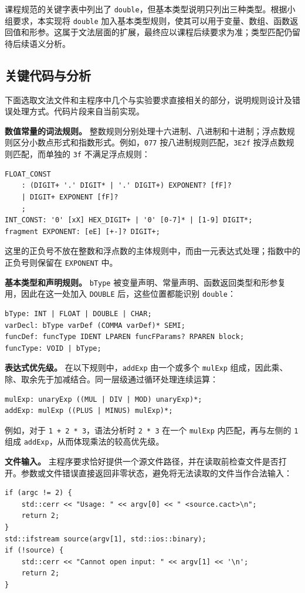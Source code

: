 \documentclass[UTF8,a4paper,11pt]{ctexart}
\begin{document}
课程规范的关键字表中列出了 \texttt{double}，但基本类型说明只列出三种类型。根据小组要求，本实现将 \texttt{double} 加入基本类型规则，使其可以用于变量、数组、函数返回值和形参。这属于文法层面的扩展，最终应以课程后续要求为准；类型匹配仍留待后续语义分析。

\subsection{关键代码与分析}
下面选取文法文件和主程序中几个与实验要求直接相关的部分，说明规则设计及错误处理方式。代码片段来自当前实现。

\textbf{数值常量的词法规则。} 整数规则分别处理十六进制、八进制和十进制；浮点数规则区分小数点形式和指数形式。例如，\texttt{077} 按八进制规则匹配，\texttt{3E2f} 按浮点数规则匹配，而单独的 \texttt{3f} 不满足浮点规则：
\begin{lstlisting}
FLOAT_CONST
    : (DIGIT+ '.' DIGIT* | '.' DIGIT+) EXPONENT? [fF]?
    | DIGIT+ EXPONENT [fF]?
    ;
INT_CONST: '0' [xX] HEX_DIGIT+ | '0' [0-7]* | [1-9] DIGIT*;
fragment EXPONENT: [eE] [+-]? DIGIT+;
\end{lstlisting}
这里的正负号不放在整数和浮点数的主体规则中，而由一元表达式处理；指数中的正负号则保留在 \texttt{EXPONENT} 中。

\textbf{基本类型和声明规则。} \texttt{bType} 被变量声明、常量声明、函数返回类型和形参复用，因此在这一处加入 \texttt{DOUBLE} 后，这些位置都能识别 \texttt{double}：
\begin{lstlisting}
bType: INT | FLOAT | DOUBLE | CHAR;
varDecl: bType varDef (COMMA varDef)* SEMI;
funcDef: funcType IDENT LPAREN funcFParams? RPAREN block;
funcType: VOID | bType;
\end{lstlisting}

\textbf{表达式优先级。} 在以下规则中，\texttt{addExp} 由一个或多个 \texttt{mulExp} 组成，因此乘、除、取余先于加减结合。同一层级通过循环处理连续运算：
\begin{lstlisting}
mulExp: unaryExp ((MUL | DIV | MOD) unaryExp)*;
addExp: mulExp ((PLUS | MINUS) mulExp)*;
\end{lstlisting}
例如，对于 \texttt{1 + 2 * 3}，语法分析时 \texttt{2 * 3} 在一个 \texttt{mulExp} 内匹配，再与左侧的 \texttt{1} 组成 \texttt{addExp}，从而体现乘法的较高优先级。

\textbf{文件输入。} 主程序要求恰好提供一个源文件路径，并在读取前检查文件是否打开。参数或文件错误直接返回非零状态，避免将无法读取的文件当作合法输入：
\begin{lstlisting}
if (argc != 2) {
    std::cerr << "Usage: " << argv[0] << " <source.cact>\n";
    return 2;
}
std::ifstream source(argv[1], std::ios::binary);
if (!source) {
    std::cerr << "Cannot open input: " << argv[1] << '\n';
    return 2;
}
\end{lstlisting}
\end{document}
